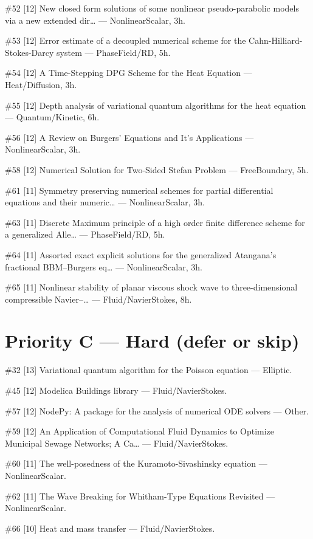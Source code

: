 \documentclass[10pt,letterpaper]{article}
\begin{document}
\#52 [12] New closed form solutions of some nonlinear pseudo-parabolic models via a new extended dir… — NonlinearScalar, 3h.

\#53 [12] Error estimate of a decoupled numerical scheme for the Cahn-Hilliard-Stokes-Darcy system — PhaseField/RD, 5h.

\#54 [12] A Time-Stepping DPG Scheme for the Heat Equation — Heat/Diffusion, 3h.

\#55 [12] Depth analysis of variational quantum algorithms for the heat equation — Quantum/Kinetic, 6h.

\#56 [12] A Review on Burgers' Equations and It's Applications — NonlinearScalar, 3h.

\#58 [12] Numerical Solution for Two-Sided Stefan Problem — FreeBoundary, 5h.

\#61 [11] Symmetry preserving numerical schemes for partial differential equations and their numeric… — NonlinearScalar, 3h.

\#63 [11] Discrete Maximum principle of a high order finite difference scheme for a generalized Alle… — PhaseField/RD, 5h.

\#64 [11] Assorted exact explicit solutions for the generalized Atangana’s fractional BBM–Burgers eq… — NonlinearScalar, 3h.

\#65 [11] Nonlinear stability of planar viscous shock wave to three-dimensional compressible Navier–… — Fluid/NavierStokes, 8h.


\section{Priority C — Hard (defer or skip)}

\#32 [13] Variational quantum algorithm for the Poisson equation — Elliptic.

\#45 [12] Modelica Buildings library — Fluid/NavierStokes.

\#57 [12] NodePy: A package for the analysis of numerical ODE solvers — Other.

\#59 [12] An Application of Computational Fluid Dynamics to Optimize Municipal Sewage Networks; A Ca… — Fluid/NavierStokes.

\#60 [11] The well-posedness of the Kuramoto-Sivashinsky equation — NonlinearScalar.

\#62 [11] The Wave Breaking for Whitham-Type Equations Revisited — NonlinearScalar.

\#66 [10] Heat and mass transfer — Fluid/NavierStokes.
\end{document}
